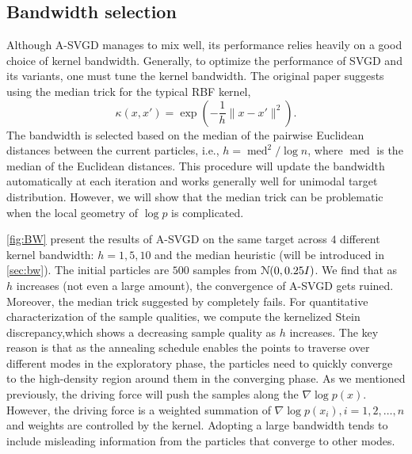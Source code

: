 \subsection{Bandwidth selection} \label{sec:bwselection}

Although A-SVGD manages to mix well, its performance relies heavily on a
good choice of kernel bandwidth. Generally, to optimize the performance of SVGD and its variants, one must tune the kernel bandwidth. The original paper \citep{liu2016stein} suggests using the median trick for the typical RBF kernel,
\[
   \kappa(x, x') = \exp(-\frac{1}{h} \|x - x'\|^2). 
\]
The bandwidth is selected based on the median of the pairwise Euclidean distances between the current particles, i.e., $h=\operatorname{med}^{2} / \log n$, where $\operatorname{med}$ is the median of the Euclidean distances. This procedure will update the bandwidth automatically at each iteration and works generally well for unimodal target distribution. However, we will show that the median trick can be problematic when the local geometry of $\log p$ is complicated.

\cref{fig:BW} present the results of A-SVGD
on the same target across $4$ different kernel bandwidth: $h = 1, 5, 10$ and
the median heuristic (will be introduced in \cref{sec:bw}). The initial
particles are $500$ \iid samples from $\mathcal{N}(0, 0.25I)$. We find that as
$h$ increases (not even a large amount), the convergence of A-SVGD gets
ruined. Moreover, the median trick suggested by \citet{liu2016stein}
completely fails. For quantitative characterization of the sample qualities,
we compute the kernelized Stein discrepancy,which shows a decreasing sample
quality as $h$ increases. The key reason is that as the annealing schedule
enables the points to traverse over different modes in the exploratory phase,
the particles need to quickly converge to the high-density region around them
in the converging phase. As we mentioned previously, the driving force will
push the samples along the $\nabla \log p(x)$. However, the driving force is
a weighted summation of $\nabla \log p(x_i), i=1, 2, \dots, n$ and weights
are controlled by the kernel. Adopting a large bandwidth tends to include
misleading information from the particles that converge to other modes.


